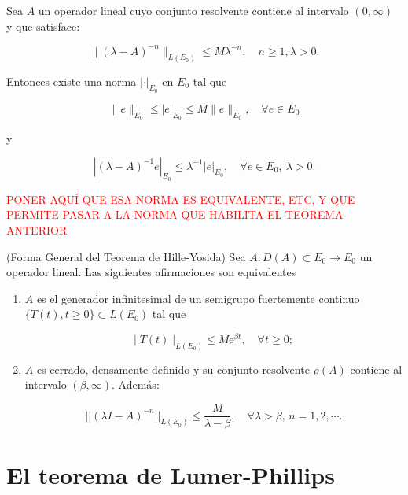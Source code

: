 \begin{Lema}
    \label{ch:semigrupos:lemma:existeNorma}
    Sea $A$ un operador lineal cuyo conjunto resolvente contiene al intervalo $(0, \infty)$ y que satisface:

    \[\lVert (\lambda - A)^{-n} \rVert_{L(E_0)} \leq M \lambda^{-n}, \quad n \geq 1, \lambda > 0.\]

    Entonces existe una norma $|\cdot|_{E_0}$ en $E_0$ tal que

    \[\lVert e \rVert_{E_0} \leq |e|_{E_0} \leq M \lVert e \rVert_{E_0}, \quad \forall e \in E_0\]

    y

    \[| (\lambda - A)^{-1}e |_{E_0} \leq \lambda^{-1}|e|_{E_0}, \quad \forall e \in E_0, \ \lambda > 0.\]
\end{Lema}

\textcolor{red}{PONER AQUÍ QUE ESA NORMA ES EQUIVALENTE, ETC, Y QUE PERMITE PASAR A LA NORMA QUE HABILITA EL TEOREMA ANTERIOR}\\

\begin{Teorema}{(Forma General del Teorema de Hille-Yosida)}
    \label{ch:semigrupos:th:HilleYosidaGeneral}
    Sea $A : D(A) \subset E_0 \rightarrow E_0$ un operador lineal. Las siguientes afirmaciones son equivalentes

    \begin{enumerate}
        \item $A$ es el generador infinitesimal de un semigrupo fuertemente continuo $\{T(t), t \geq 0\} \subset L(E_0)$ tal que

        \[||T(t)||_{L(E_0)} \leq M\mathrm{e}^{\beta t}, \quad \forall t \geq 0;\]

        \item $A$ es cerrado, densamente definido y su conjunto resolvente $\rho(A)$ contiene al intervalo $(\beta, \infty)$. Además:

        \[||(\lambda I - A)^{-n}||_{L(E_0)} \leq \frac{M}{\lambda - \beta}, \quad \forall \lambda > \beta, \, n = 1,2,\cdots .\]
    \end{enumerate}
\end{Teorema}

\section{El teorema de Lumer-Phillips}
\label{ch:semigrupos:section:LumerPhillips}

